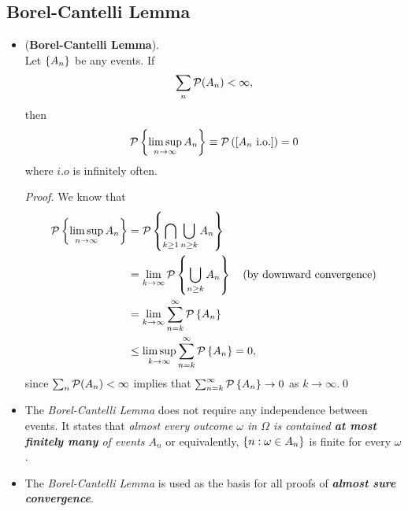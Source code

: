 \documentclass[11pt]{article}
\begin{document}
\subsection{Borel-Cantelli Lemma}
\begin{itemize}
\item \begin{theorem} (\textbf{Borel-Cantelli Lemma}). \citep{resnick2013probability} \\
Let $\left\{A_{n}\right\}$ be any events. If 
\begin{align*}
\sum_{n}{\mathcal P}(A_{n})<\infty,
\end{align*}  then
\begin{align*}
{\mathcal P}\left\{ \limsup\limits_{n\rightarrow \infty} A_{n} \right\} \equiv {\mathcal P}\left(\left[A_{n} \text{ i.o.}\right]\right) = 0
\end{align*}
where $i.o$ is infinitely often.
\end{theorem}
\begin{proof}
We know that
\begin{align*}
{\mathcal P}\left\{ \limsup\limits_{n\rightarrow \infty} A_{n} \right\}&= {\mathcal P}\left\{ \bigcap_{k\ge 1}\bigcup_{n\ge k}A_{n}  \right\}\\
&= \lim\limits_{k\rightarrow \infty}{\mathcal P}\left\{\bigcup_{n\ge k}A_{n}  \right\} \quad (\text{by downward convergence})\\
&= \lim\limits_{k\rightarrow \infty}\sum_{n=k}^{\infty}{\mathcal P}\left\{A_{n}\right\}\\
&\le  \limsup\limits_{k\rightarrow \infty}\sum_{n=k}^{\infty}{\mathcal P}\left\{A_{n}\right\} = 0,
\end{align*}
since $\sum_{n}{\mathcal P}(A_{n})<\infty$ implies that $\sum_{n=k}^{\infty}{\mathcal P}\left\{A_{n}\right\} \rightarrow 0$ as $k\rightarrow \infty$.\qed
\end{proof}

\item \begin{remark}
The \emph{Borel-Cantelli Lemma} does not require any independence between events. It states that \emph{almost every outcome $\omega$ in $\Omega$  is contained \textbf{at most finitely many} of events $A_n$} or equivalently, $\left\{n: \omega \in A_n\right\}$ is finite for every $\omega$.
\end{remark}

\item \begin{remark}
The \emph{Borel-Cantelli Lemma} is used as the basis for all proofs of \emph{\textbf{almost sure convergence}}. 
\end{remark}
\end{itemize}
\end{document}
